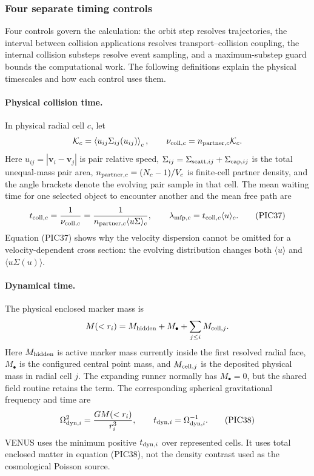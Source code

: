 \subsubsection{Four separate timing controls}

Four controls govern the calculation: the orbit step resolves trajectories,
the interval between collision applications resolves transport--collision
coupling, the internal collision substeps resolve event sampling, and a
maximum-substep guard bounds the computational work.  The following
definitions explain the physical timescales and how each control uses them.

\paragraph{Physical collision time.}
In physical radial cell \(c\), let
\[
 {\cal K}_c=\left\langle
 u_{ij}\Sigma_{ij}(u_{ij})\right\rangle_c,
 \qquad
 \nu_{{\rm coll},c}=n_{{\rm partner},c}{\cal K}_c .
\]
Here \(u_{ij}=|\boldsymbol v_i-\boldsymbol v_j|\) is pair relative speed,
\(\Sigma_{ij}=\Sigma_{{\rm scatt},ij}+\Sigma_{{\rm cap},ij}\) is the total
unequal-mass pair area,
\(n_{{\rm partner},c}=(N_c-1)/V_c\) is finite-cell partner density, and the
angle brackets denote the evolving pair sample in that cell.  The mean
waiting time for one selected object to encounter another and the mean free
path are
\[
 t_{{\rm coll},c}=\frac{1}{\nu_{{\rm coll},c}}
 =\frac{1}{n_{{\rm partner},c}\langle u\Sigma\rangle_c},
 \qquad
 \lambda_{{\rm mfp},c}
 =t_{{\rm coll},c}\langle u\rangle_c .                 \tag{PIC37}
\]
Equation (PIC37) shows why the velocity dispersion cannot be omitted for a
velocity-dependent cross section: the evolving distribution changes both
\(\langle u\rangle\) and \(\langle u\Sigma(u)\rangle\).

\paragraph{Dynamical time.}
The physical enclosed marker mass is
\[
 M(<r_i)=M_{\rm hidden}+M_\bullet
          +\sum_{j\leq i}M_{{\rm cell},j}.
\]
Here \(M_{\rm hidden}\) is active marker mass currently inside the first
resolved radial face, \(M_\bullet\) is the configured central point mass, and
\(M_{{\rm cell},j}\) is the deposited physical mass in radial cell \(j\).
The expanding runner normally has \(M_\bullet=0\), but the shared field
routine retains the term.
The corresponding spherical gravitational frequency and time are
\[
 \Omega_{{\rm dyn},i}^2=\frac{G M(<r_i)}{r_i^3},
 \qquad
 t_{{\rm dyn},i}=\Omega_{{\rm dyn},i}^{-1}.             \tag{PIC38}
\]
VENUS uses the minimum positive \(t_{{\rm dyn},i}\) over represented cells.
It uses total enclosed matter in equation (PIC38), not the density contrast
used as the cosmological Poisson source.

